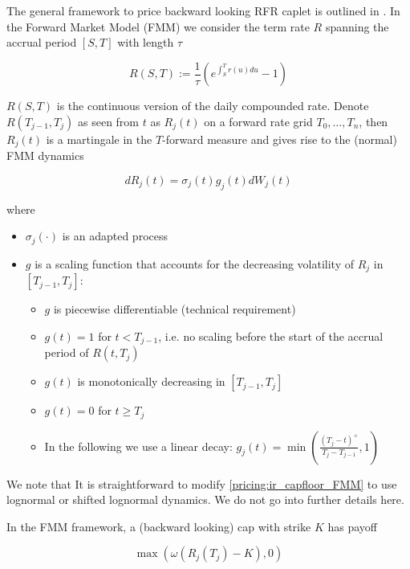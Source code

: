 The general framework to price backward looking RFR caplet is outlined in \cite{Lyashenko_Mercurio_2019}. In the Forward
Market Model (FMM) we consider the term rate $R$ spanning the accrual period $[S,T]$ with length $\tau$

\begin{equation}
R(S,T) := \frac{1}{\tau} \left( e^{\int_S^T r(u) du} - 1 \right)
\end{equation}

$R(S,T)$ is the continuous version of the daily compounded rate. Denote $R(T_{j-1}, T_j)$ as seen from $t$ as $R_j(t)$
on a forward rate grid $T_0, \ldots, T_n$, then $R_j(t)$ is a martingale in the $T$-forward measure and gives rise to
the (normal) FMM dynamics

\begin{equation}\label{pricing:ir_capfloor_FMM}
dR_j(t) = \sigma_j(t) g_j(t) dW_j(t)
\end{equation}

where

\begin{itemize}
\item $\sigma_j(\cdot)$ is an adapted process
\item $g$ is a scaling function that accounts for the decreasing volatility of $R_j$ in $[T_{j-1},T_{j}]$:
  \begin{itemize}
  \item $g$ is piecewise differentiable (technical requirement)
  \item $g(t) = 1$ for $t < T_{j-1}$, i.e. no scaling before the start of the accrual period of $R(t,T_j)$
  \item $g(t)$ is monotonically decreasing in $[T_{j-1}, T_j]$
  \item $g(t) = 0$ for $t \geq T_j$
  \item In the following we use a linear decay: $g_j(t) = \min \left( \frac{(T_j-t)^+}{T_j-T_{j-1}}, 1 \right)$
  \end{itemize}
\end{itemize}

We note that It is straightforward to modify \ref{pricing:ir_capfloor_FMM} to use lognormal or shifted lognormal
dynamics. We do not go into further details here.

In the FMM framework, a (backward looking) cap with strike $K$ has payoff

\begin{equation}
\max( \omega (R_j(T_j) - K) , 0)
\end{equation}

